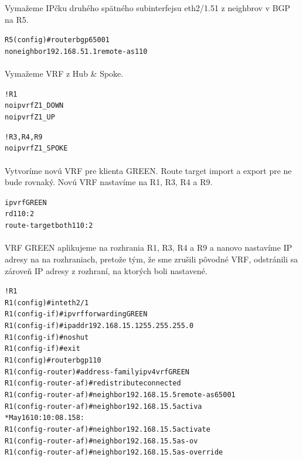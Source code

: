 \documentclass[12pt,twoside,a4paper]{report}
\begin{document}
Vymažeme IPčku druhého spätného subinterfejsu eth2/1.51  z neighbrov v BGP na R5.

\noindent
{\selectfont
\begin{small}
\begin{alltt}
R5(config)#router bgp 65001
  no neighbor 192.168.51.1 remote-as 110
\end{alltt}
\end{small}
}


\paragraph{}
Vymažeme VRF z Hub \& Spoke.

\noindent
{\selectfont
\begin{small}
\begin{alltt}
!R1
no ip vrf Z1_DOWN
no ip vrf Z1_UP

!R3, R4, R9
no ip vrf Z1_SPOKE
\end{alltt}
\end{small}
}

\paragraph{}
Vytvoríme novú VRF pre klienta GREEN. Route target import a export pre ne bude rovnaký. Novú VRF nastavíme na R1, R3, R4 a R9.

\noindent
{\selectfont
\begin{small}
\begin{alltt}
ip vrf GREEN
  rd 110:2
  route-target both 110:2
\end{alltt}
\end{small}
}

\paragraph{}
VRF GREEN aplikujeme na rozhrania R1, R3, R4 a R9 a nanovo nastavíme IP adresy na na rozhraniach, pretože tým, že sme zrušili pôvodné VRF, odstránili sa zároveň IP adresy z rozhraní, na ktorých boli nastavené.

\noindent
{\selectfont
\begin{small}
\begin{alltt}
!R1
R1(config)#int eth2/1
R1(config-if)#ip vrf forwarding GREEN
R1(config-if)#ip addr 192.168.15.1 255.255.255.0
R1(config-if)#no shut
R1(config-if)#exit
R1(config)#router bgp 110          
R1(config-router)#address-family ipv4 vrf GREEN
R1(config-router-af)#redistribute connected
R1(config-router-af)#neighbor 192.168.15.5 remote-as 65001
R1(config-router-af)#neighbor 192.168.15.5 activa         
*May 16 10:10:08.158: %
R1(config-router-af)#neighbor 192.168.15.5 activate
R1(config-router-af)#neighbor 192.168.15.5 as-ov   
R1(config-router-af)#neighbor 192.168.15.5 as-override
\end{alltt}
\end{small}
}
\end{document}
